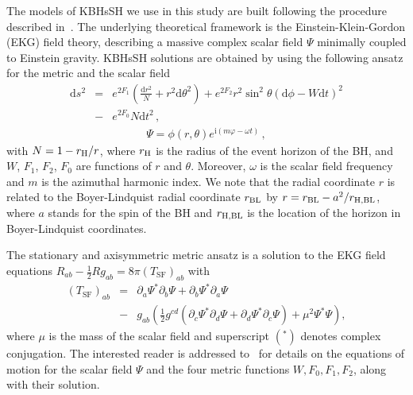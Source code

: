 \documentclass[twocolumn,aps,showpacs,showkeys,prd,superscriptaddress,byrevtex, amsmath]{revtex4-1}
\begin{document}
The models of KBHsSH we use in this study are built following the procedure described in~\cite{Herdeiro:2015b}. The underlying theoretical framework is the Einstein-Klein-Gordon (EKG) field theory, describing a massive complex scalar field $\Psi$ minimally coupled to Einstein gravity. KBHsSH solutions are obtained by using the following ansatz for the metric and the scalar field~\cite{Herdeiro:2014a}
\begin{eqnarray}
\mathrm{d}s^2 &=& e^{2F_1}\left(\frac{\mathrm{d}r^2}{N} + r^2\mathrm{d}\theta^2\right) +  e^{2F_2}r^2\sin^2 \theta(\mathrm{d}\phi-W\mathrm{d}t)^2 
\nonumber \\ 
&-&  e^{2F_0}N\mathrm{d}t^2\,,
\label{metric}
\end{eqnarray}
\begin{eqnarray}
\Psi = \phi(r, \theta) e^{\mathrm{i}(m\varphi - \omega t)} \,,
\end{eqnarray}
with $N = 1 - r_{\rm H}/r$, where $r_{\rm H}$ is the radius of the event horizon of the BH, and $W$, $F_1$, $F_2$, $F_0$ are functions of $r$ and $\theta$. Moreover, $\omega$ is the scalar field frequency and $m$ is the azimuthal harmonic index.
We note that the radial coordinate $r$ is related to the Boyer-Lindquist radial coordinate $r_{\rm BL}$ by $r=r_{\rm BL}-a^2/r_{\rm H,BL}$, where $a$ stands for the spin of the BH and $r_{\rm H,BL}$ is the location of the horizon in Boyer-Lindquist coordinates.

The stationary and axisymmetric metric ansatz is a solution to the EKG field equations $R_{ab} - \frac{1}{2}R g _{ab} = 8 \pi (T_{\mathrm{SF}})_{ab}$ with 
\begin{eqnarray}\label{eq:e-m_scalaf_field}
(T_{\mathrm{SF}})_{ab} &=& \partial_a \Psi^* \partial_b \Psi + \partial_b \Psi^* \partial_a \Psi 
\nonumber \\ 
&-& g_{ab} \left(\frac{1}{2} g^{cd}(\partial_c \Psi^* \partial_d \Psi + \partial_d \Psi^* \partial_c \Psi) + \mu^2 \Psi^* \Psi \right),
\end{eqnarray}
where $\mu$ is the mass of the scalar field and superscript $(^*)$ denotes complex conjugation. The interested reader is addressed to~\cite{Herdeiro:2015b} for details on the equations of motion for the scalar field $\Psi$ and the four metric functions ${W, F_0,F_1,F_2}$, along with their solution.
\end{document}
